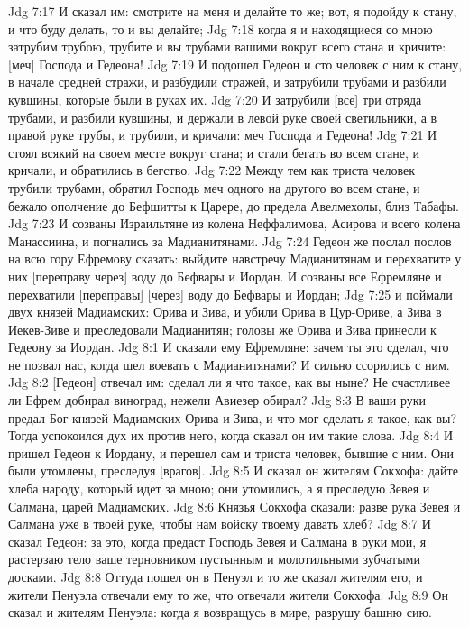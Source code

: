 Jdg 7:17  И сказал им: смотрите на меня и делайте то же; вот, я подойду к стану, и что буду делать, то и вы делайте;
Jdg 7:18  когда я и находящиеся со мною затрубим трубою, трубите и вы трубами вашими вокруг всего стана и кричите: [меч] Господа и Гедеона!
Jdg 7:19  И подошел Гедеон и сто человек с ним к стану, в начале средней стражи, и разбудили стражей, и затрубили трубами и разбили кувшины, которые были в руках их.
Jdg 7:20  И затрубили [все] три отряда трубами, и разбили кувшины, и держали в левой руке своей светильники, а в правой руке трубы, и трубили, и кричали: меч Господа и Гедеона!
Jdg 7:21  И стоял всякий на своем месте вокруг стана; и стали бегать во всем стане, и кричали, и обратились в бегство.
Jdg 7:22  Между тем как триста человек трубили трубами, обратил Господь меч одного на другого во всем стане, и бежало ополчение до Бефшитты к Царере, до предела Авелмехолы, близ Табафы.
Jdg 7:23  И созваны Израильтяне из колена Неффалимова, Асирова и всего колена Манассиина, и погнались за Мадианитянами.
Jdg 7:24  Гедеон же послал послов на всю гору Ефремову сказать: выйдите навстречу Мадианитянам и перехватите у них [переправу через] воду до Бефвары и Иордан. И созваны все Ефремляне и перехватили [переправы] [через] воду до Бефвары и Иордан;
Jdg 7:25  и поймали двух князей Мадиамских: Орива и Зива, и убили Орива в Цур-Ориве, а Зива в Иекев-Зиве и преследовали Мадианитян; головы же Орива и Зива принесли к Гедеону за Иордан.
Jdg 8:1  И сказали ему Ефремляне: зачем ты это сделал, что не позвал нас, когда шел воевать с Мадианитянами? И сильно ссорились с ним.
Jdg 8:2  [Гедеон] отвечал им: сделал ли я что такое, как вы ныне? Не счастливее ли Ефрем добирал виноград, нежели Авиезер обирал?
Jdg 8:3  В ваши руки предал Бог князей Мадиамских Орива и Зива, и что мог сделать я такое, как вы? Тогда успокоился дух их против него, когда сказал он им такие слова.
Jdg 8:4  И пришел Гедеон к Иордану, и перешел сам и триста человек, бывшие с ним. Они были утомлены, преследуя [врагов].
Jdg 8:5  И сказал он жителям Сокхофа: дайте хлеба народу, который идет за мною; они утомились, а я преследую Зевея и Салмана, царей Мадиамских.
Jdg 8:6  Князья Сокхофа сказали: разве рука Зевея и Салмана уже в твоей руке, чтобы нам войску твоему давать хлеб?
Jdg 8:7  И сказал Гедеон: за это, когда предаст Господь Зевея и Салмана в руки мои, я растерзаю тело ваше терновником пустынным и молотильными зубчатыми досками.
Jdg 8:8  Оттуда пошел он в Пенуэл и то же сказал жителям его, и жители Пенуэла отвечали ему то же, что отвечали жители Сокхофа.
Jdg 8:9  Он сказал и жителям Пенуэла: когда я возвращусь в мире, разрушу башню сию.
